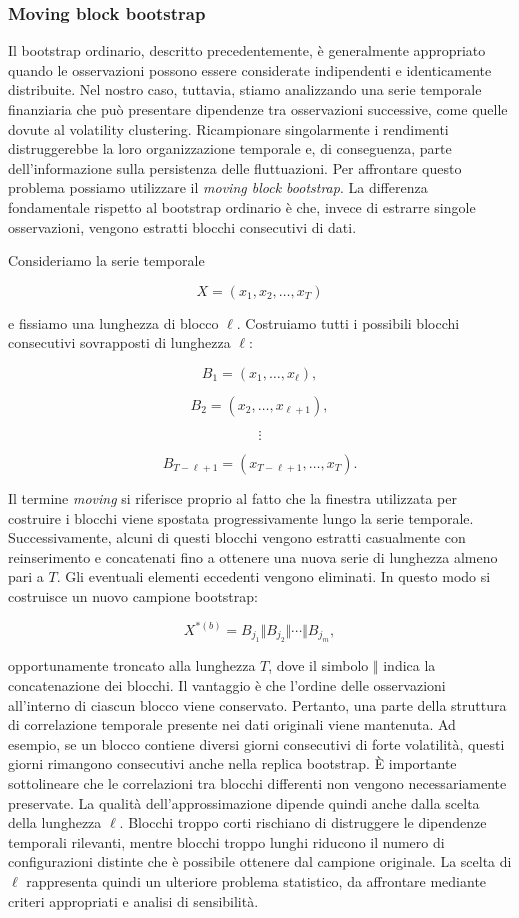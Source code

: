 \subsubsection{Moving block bootstrap}
Il bootstrap ordinario, descritto precedentemente, è generalmente appropriato quando le osservazioni possono essere considerate indipendenti e identicamente distribuite.
Nel nostro caso, tuttavia, stiamo analizzando una serie temporale finanziaria che può presentare dipendenze tra osservazioni successive, come quelle 
dovute al volatility clustering. Ricampionare singolarmente i rendimenti distruggerebbe la loro organizzazione temporale e, di conseguenza, parte 
dell'informazione sulla persistenza delle fluttuazioni. Per affrontare questo problema possiamo utilizzare il \textit{moving block bootstrap}.
La differenza fondamentale rispetto al bootstrap ordinario è che, invece di estrarre singole osservazioni, vengono estratti blocchi consecutivi di dati.

Consideriamo la serie temporale

\[
X=(x_1,x_2,\ldots,x_T)
\]

e fissiamo una lunghezza di blocco $\ell$. Costruiamo tutti i possibili blocchi consecutivi sovrapposti di lunghezza
$\ell$:

\[
B_1=(x_1,\ldots,x_{\ell}),
\]

\[
B_2=(x_2,\ldots,x_{\ell+1}),
\]

\[
\vdots
\]

\[
B_{T-\ell+1}
=
(x_{T-\ell+1},\ldots,x_T).
\]

Il termine \textit{moving} si riferisce proprio al fatto che la finestra utilizzata per costruire i blocchi viene spostata progressivamente lungo la 
serie temporale.
Successivamente, alcuni di questi blocchi vengono estratti casualmente con reinserimento e concatenati fino a ottenere una nuova serie di lunghezza 
almeno pari a $T$. Gli eventuali elementi eccedenti vengono eliminati.
In questo modo si costruisce un nuovo campione bootstrap:

\[
X^{*(b)}
=
B_{j_1}\Vert B_{j_2}\Vert\cdots\Vert B_{j_m},
\]

opportunamente troncato alla lunghezza $T$, dove il simbolo $\Vert$ indica la concatenazione dei blocchi.
Il vantaggio è che l'ordine delle osservazioni all'interno di ciascun blocco viene conservato. Pertanto, una parte della struttura di correlazione 
temporale presente nei dati originali viene mantenuta.
Ad esempio, se un blocco contiene diversi giorni consecutivi di forte volatilità, questi giorni rimangono consecutivi anche nella replica bootstrap.
È importante sottolineare che le correlazioni tra blocchi differenti non vengono necessariamente preservate. La qualità dell'approssimazione dipende 
quindi anche dalla scelta della lunghezza $\ell$.
Blocchi troppo corti rischiano di distruggere le dipendenze temporali rilevanti, mentre blocchi troppo lunghi riducono il numero di configurazioni 
distinte che è possibile ottenere dal campione originale.
La scelta di $\ell$ rappresenta quindi un ulteriore problema statistico, da affrontare mediante criteri appropriati e analisi di sensibilità.

